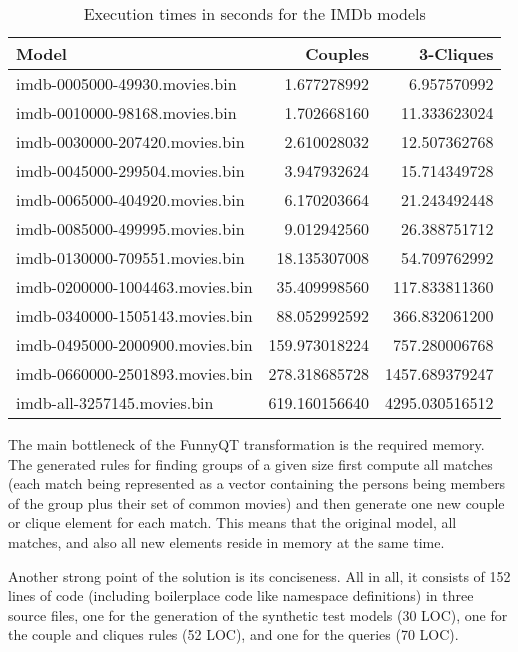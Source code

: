 \documentclass[submission]{eptcs}
\begin{document}
\begin{table}
  \centering
  \begin{tabular}{| l | r | r |}
    \hline
    \textbf{Model}                  & \textbf{Couples} & \textbf{3-Cliques}\\
    \hline
    imdb-0005000-49930.movies.bin   &   1.677278992    &        6.957570992\\
    imdb-0010000-98168.movies.bin   &   1.702668160    &        11.333623024\\
    imdb-0030000-207420.movies.bin  &   2.610028032    &        12.507362768\\
    imdb-0045000-299504.movies.bin  &   3.947932624    &        15.714349728\\
    imdb-0065000-404920.movies.bin  &   6.170203664    &        21.243492448\\
    imdb-0085000-499995.movies.bin  &   9.012942560    &        26.388751712\\
    imdb-0130000-709551.movies.bin  &   18.135307008   &        54.709762992\\
    imdb-0200000-1004463.movies.bin &   35.409998560   &        117.833811360\\
    imdb-0340000-1505143.movies.bin &   88.052992592   &        366.832061200\\
    imdb-0495000-2000900.movies.bin &   159.973018224  &        757.280006768\\
    imdb-0660000-2501893.movies.bin &   278.318685728  &        1457.689379247\\
    imdb-all-3257145.movies.bin     &   619.160156640  &        4295.030516512\\
    \hline
  \end{tabular}
  \caption{Execution times in seconds for the IMDb models}
  \label{tab:bench-imdb}
\end{table}

The main bottleneck of the FunnyQT transformation is the required memory.  The
generated rules for finding groups of a given size first compute all matches
(each match being represented as a vector containing the persons being members
of the group plus their set of common movies) and then generate one new couple
or clique element for each match.  This means that the original model, all
matches, and also all new elements reside in memory at the same time.

Another strong point of the solution is its conciseness.  All in all, it
consists of 152 lines of code (including boilerplace code like namespace
definitions) in three source files, one for the generation of the synthetic
test models (30 LOC), one for the couple and cliques rules (52 LOC), and one
for the queries (70 LOC).




\end{document}
